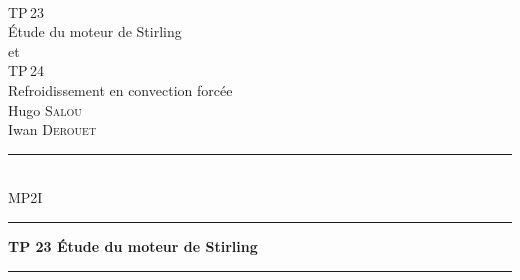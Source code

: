 \documentclass[a4paper]{report}
\let\sc\scshape
\let\bf\bfseries
\begin{document}
	\begin{titlepage}
		\begin{center}
			~\\
			\vspace{4cm}
			{\Large \sc TP\,23}\\
			\vspace{0.5cm}
			{\Huge \cursive Étude du moteur de Stirling}\\
			\vspace{1.5cm}
			{\large et}\\
			\vspace{1.5cm}
			{\Large \sc TP\,24}\\
			\vspace{0.5cm}
			{\Huge \cursive Refroidissement en convection forcée}\\
			\vfill
			\vfill
			{Hugo {\sc Salou}\\Iwan {\sc Derouet}}\\
			\vspace{1.5mm}
			\rule{4cm}{0.4pt}\\
			\vspace{3.5mm}
			MP2I\\
		\end{center}
	\end{titlepage}

	\vspace{2.5mm}
	\par\noindent\rule{\textwidth}{0.4pt}
	{\Large \bf TP 23 \hfill Étude du moteur de Stirling\hfill \phantom{TP 23}}\\[-3mm]
	\rule{\textwidth}{0.4pt}
	\vspace{2.5mm}
\end{document}
